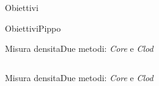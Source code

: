 \documentclass[10pt]{beamer}
\begin{document}
\begin{frame}{Obiettivi}
\begin{frame}{Obiettivi}{Pippo}
\begin{frame}{Misura densita}{Due metodi: \emph{Core} e \emph{Clod}}
\begin{columns}[c]
  \end{columns}
\end{frame}


\begin{frame}{Misura densita}{Due metodi: \emph{Core} e \emph{Clod}}


\end{frame}
\end{frame}
\end{frame}
\end{document}

